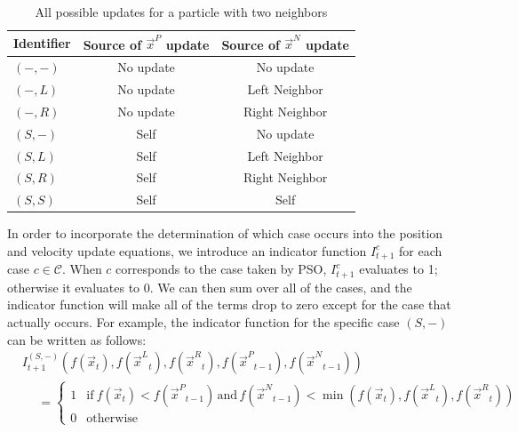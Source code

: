 \documentclass{llncs}
\newcommand{\parens}[1]{\!\left(#1\right)}
\providecommand{\pers}{\ensuremath{P}}
\providecommand{\neigh}{\ensuremath{N}}
\providecommand{\leftind}{\ensuremath{L}}
\providecommand{\rightind}{\ensuremath{R}}
\providecommand{\ppos}{\ensuremath{\Vec{x}}}
\providecommand{\nbest}{\ensuremath{\Vec{x}^\neigh}}
\providecommand{\pbest}{\ensuremath{\Vec{x}^\pers}}
\providecommand{\ofunc}{\ensuremath{f}}
\providecommand{\indic}{\ensuremath{I}}
\providecommand{\leftn}{\ensuremath{\Vec{x}^\leftind}}
\providecommand{\rightn}{\ensuremath{\Vec{x}^\rightind}}
\providecommand{\caseset}{\ensuremath{\mathcal{C}}}
\providecommand{\casegen}{\ensuremath{c}}
\providecommand{\casexn}{\ensuremath{(S,-)}}
\providecommand{\casexx}{\ensuremath{(S,S)}}
\providecommand{\casexl}{\ensuremath{(S,\leftind)}}
\providecommand{\casexr}{\ensuremath{(S,\rightind)}}
\providecommand{\casepn}{\ensuremath{(-,-)}}
\providecommand{\casepl}{\ensuremath{(-,\leftind)}}
\providecommand{\casepr}{\ensuremath{(-,\rightind)}}
\begin{document}
\begin{table}
  \caption{All possible updates for a particle with two neighbors}
  \label{tab:evals}
  \centering
  \begin{tabular}{lcc}
	Identifier&Source of $\pbest$ update&Source of $\nbest$ update\\
	\hline
	\hline
	$\casepn$&No update&No update\\
	\hline
	$\casepl$&No update&Left Neighbor\\
	\hline
	$\casepr$&No update&Right Neighbor\\
	\hline
	$\casexn$&Self&No update\\
	\hline
	$\casexl$&Self&Left Neighbor\\
	\hline
	$\casexr$&Self&Right Neighbor\\
	\hline
	$\casexx$&Self&Self\\
	\hline
  \end{tabular}
\end{table}

In order to incorporate the determination of which case occurs into the
position and velocity update equations, we introduce an indicator function
$\indic_{t+1}^{\casegen}$ for each case $\casegen \in \caseset$.  When
$\casegen$ corresponds to the case taken by PSO,
$\indic_{t+1}^{\casegen}$ evaluates to 1; otherwise it evaluates to 0.  We can
then sum over all of the cases, and the indicator function will make all of the
terms drop to zero except for the case that actually occurs.  For example, the
indicator function for the specific case $\casexn$ can be written as follows:
\begin{align}
  \nonumber
	&\indic_{t+1}^{\casexn}\parens{
	  \ofunc\parens{\ppos_{t}},
	  \ofunc\parens{\leftn_{t}},
	  \ofunc\parens{\rightn_{t}},
	  \ofunc\parens{\pbest_{t-1}},
	  \ofunc\parens{\nbest_{t-1}}
	  } \\
  &\hspace{15pt}= \label{eq:deficasexn}
	\begin{cases}
	  1 & \text{if}~
		\ofunc\parens{\ppos_{t}} < \ofunc\parens{\pbest_{t-1}}
	    \,\text{and}\,
		\ofunc\parens{\nbest_{t-1}} < \min\parens{
		  \ofunc\parens{\ppos_{t}},
		  \ofunc\parens{\leftn_{t}},
		  \ofunc\parens{\rightn_{t}}
		} \\
	   0 & \text{otherwise}
	\end{cases}
\end{align}
\end{document}
